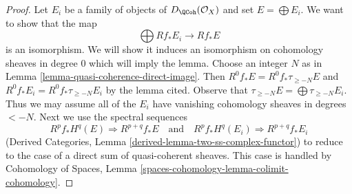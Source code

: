 \begin{proof}
Let $E_i$ be a family of objects of $D_\QCoh(\mathcal{O}_X)$
and set $E = \bigoplus E_i$. We want to show that the map
$$
\bigoplus Rf_*E_i \longrightarrow Rf_*E
$$
is an isomorphism. We will show it induces an isomorphism on
cohomology sheaves in degree $0$ which will imply the lemma.
Choose an integer $N$ as in Lemma \ref{lemma-quasi-coherence-direct-image}.
Then $R^0f_*E = R^0f_*\tau_{\geq -N}E$ and
$R^0f_*E_i = R^0f_*\tau_{\geq -N}E_i$ by the lemma cited. Observe that
$\tau_{\geq -N}E = \bigoplus \tau_{\geq -N}E_i$.
Thus we may assume all of the $E_i$ have vanishing cohomology
sheaves in degrees $< -N$. Next we use the spectral sequences
$$
R^pf_*H^q(E) \Rightarrow R^{p + q}f_*E
\quad\text{and}\quad
R^pf_*H^q(E_i) \Rightarrow R^{p + q}f_*E_i
$$
(Derived Categories, Lemma \ref{derived-lemma-two-ss-complex-functor})
to reduce to the case of a direct sum of quasi-coherent sheaves.
This case is handled by
Cohomology of Spaces, Lemma \ref{spaces-cohomology-lemma-colimit-cohomology}.
\end{proof}

